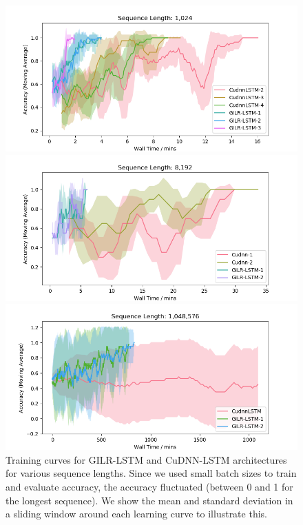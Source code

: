 \documentclass{article}
\begin{document}
\begin{figure}
  \centering
  \begin{minipage}{0.5\textwidth}
    \includegraphics[width=1.0\textwidth]{./1k_synthetic_new.png}
  \end{minipage}%
    \begin{minipage}{0.5\textwidth}
    \includegraphics[width=1.0\textwidth]{./8k_synthetic_new.png}
  \end{minipage}
  \begin{minipage}{0.5\textwidth}
    \includegraphics[width=1.0\textwidth]{./1m_synthetic_new.png}
  \end{minipage}
  \caption{Training curves for GILR-LSTM and CuDNN-LSTM architectures for various
    sequence lengths. Since we used
    small batch sizes to train and evaluate accuracy, the accuracy fluctuated
    (between 0 and 1 for the longest sequence). We show the mean and standard deviation
    in a sliding window around each learning curve to illustrate this.}
    \label{fig:synthetic_training}
  \end{figure}
\end{document}
